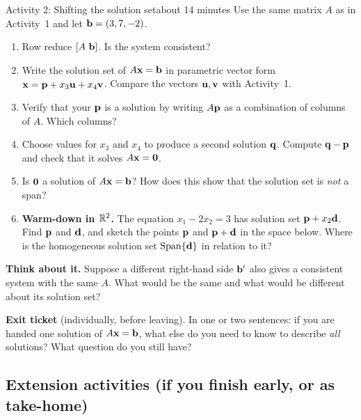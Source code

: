 \documentclass[11pt]{article}
\begin{document}
\newpage
\begin{activity}{Activity 2: Shifting the solution set}{about 14 minutes}
Use the same matrix $A$ as in Activity~1 and let $\mathbf{b}=(3,7,-2)$.
\begin{enumerate}[label=(\alph*),itemsep=6pt]
  \item Row reduce $[A\ \mathbf{b}]$. Is the system consistent?
        \workspace{1.4in}
  \item Write the solution set of $A\mathbf{x}=\mathbf{b}$ in parametric vector form $\mathbf{x}=\mathbf{p}+x_3\mathbf{u}+x_4\mathbf{v}$. Compare the vectors $\mathbf{u},\mathbf{v}$ with Activity~1.
        \answerline
  \item Verify that your $\mathbf{p}$ is a solution by writing $A\mathbf{p}$ as a combination of columns of $A$. Which columns?
        \answerline
  \item Choose values for $x_3$ and $x_4$ to produce a second solution $\mathbf{q}$. Compute $\mathbf{q}-\mathbf{p}$ and check that it solves $A\mathbf{x}=\mathbf{0}$.
        \answerline
  \item Is $\mathbf{0}$ a solution of $A\mathbf{x}=\mathbf{b}$? How does this show that the solution set is \emph{not} a span?
        \answerline
  \item \textbf{Warm-down in $\mathbb{R}^2$.} The equation $x_1-2x_2=3$ has solution set $\mathbf{p}+x_2\mathbf{d}$. Find $\mathbf{p}$ and $\mathbf{d}$, and sketch the points $\mathbf{p}$ and $\mathbf{p}+\mathbf{d}$ in the space below. Where is the homogeneous solution set $\operatorname{Span}\{\mathbf{d}\}$ in relation to it?
        \workspace{1.6in}
\end{enumerate}
\textbf{Think about it.} Suppose a different right-hand side $\mathbf{b}'$ also gives a consistent system with the same $A$. What would be the same and what would be different about its solution set?
\answerline\answerline
\end{activity}

\textbf{Exit ticket} (individually, before leaving). In one or two sentences: if you are handed one solution of $A\mathbf{x}=\mathbf{b}$, what else do you need to know to describe \emph{all} solutions? What question do you still have?
\answerline\answerline

\newpage
\subsection*{Extension activities \quad (if you finish early, or as take-home)}
\end{document}
